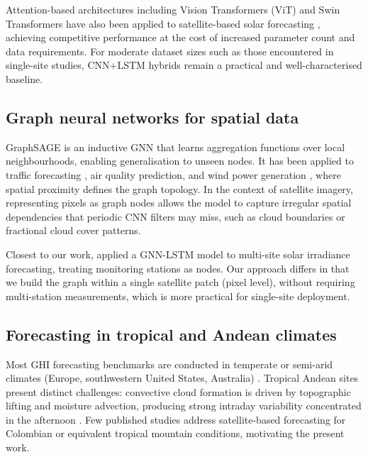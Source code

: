 Attention-based architectures including Vision Transformers (ViT) and Swin
Transformers have also been applied to satellite-based solar forecasting
\cite{acikgoz2022,liu2023}, achieving competitive performance at the cost of
increased parameter count and data requirements. For moderate dataset sizes such
as those encountered in single-site studies, CNN+LSTM hybrids remain a practical
and well-characterised baseline.

\subsection{Graph neural networks for spatial data}

GraphSAGE \cite{hamilton2017} is an inductive GNN that learns aggregation
functions over local neighbourhoods, enabling generalisation to unseen nodes.
It has been applied to traffic forecasting \cite{li2018}, air quality prediction,
and wind power generation \cite{kazem2021}, where spatial proximity defines the
graph topology. In the context of satellite imagery, representing pixels as graph
nodes allows the model to capture irregular spatial dependencies that periodic
CNN filters may miss, such as cloud boundaries or fractional cloud cover patterns.

Closest to our work, \cite{ji2022} applied a GNN-LSTM model to multi-site solar
irradiance forecasting, treating monitoring stations as nodes. Our approach differs
in that we build the graph within a single satellite patch (pixel level), without
requiring multi-station measurements, which is more practical for single-site
deployment.

\subsection{Forecasting in tropical and Andean climates}

Most GHI forecasting benchmarks are conducted in temperate or semi-arid climates
(Europe, southwestern United States, Australia) \cite{paletta2022,benchmarks2023}.
Tropical Andean sites present distinct challenges: convective cloud formation is
driven by topographic lifting and moisture advection, producing strong intraday
variability concentrated in the afternoon \cite{poveda2004}. Few published studies
address satellite-based forecasting for Colombian or equivalent tropical mountain
conditions, motivating the present work.
